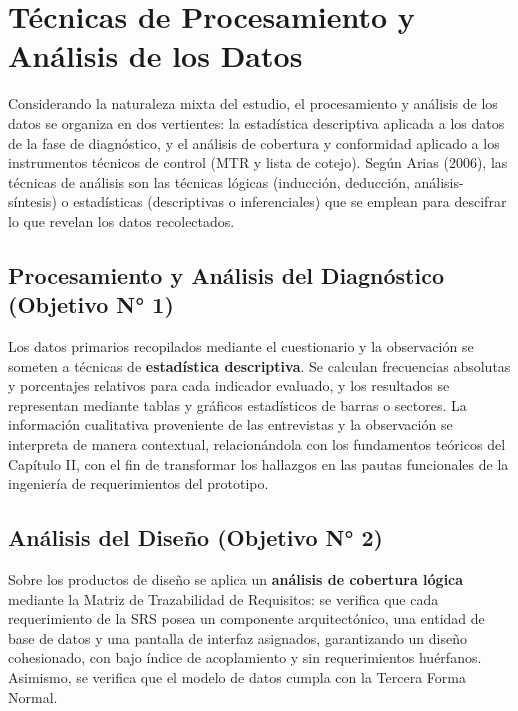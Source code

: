 \documentclass[12pt, letterpaper]{report}
\begin{document}
\section{Técnicas de Procesamiento y Análisis de los Datos}

Considerando la naturaleza mixta del estudio, el procesamiento y
análisis de los datos se organiza en dos vertientes: la estadística
descriptiva aplicada a los datos de la fase de diagnóstico, y el
análisis de cobertura y conformidad aplicado a los instrumentos
técnicos de control (MTR y lista de cotejo). Según Arias (2006), las
técnicas de análisis son las técnicas lógicas (inducción, deducción,
análisis-síntesis) o estadísticas (descriptivas o inferenciales) que se
emplean para descifrar lo que revelan los datos recolectados.

\subsection{Procesamiento y Análisis del Diagnóstico (Objetivo N° 1)}

Los datos primarios recopilados mediante el cuestionario y la
observación se someten a técnicas de \textbf{estadística descriptiva}.
Se calculan frecuencias absolutas y porcentajes relativos para cada
indicador evaluado, y los resultados se representan mediante tablas y
gráficos estadísticos de barras o sectores. La información cualitativa
proveniente de las entrevistas y la observación se interpreta de manera
contextual, relacionándola con los fundamentos teóricos del Capítulo II,
con el fin de transformar los hallazgos en las pautas funcionales de la
ingeniería de requerimientos del prototipo.

\subsection{Análisis del Diseño (Objetivo N° 2)}

Sobre los productos de diseño se aplica un \textbf{análisis de cobertura
lógica} mediante la Matriz de Trazabilidad de Requisitos: se verifica
que cada requerimiento de la SRS posea un componente arquitectónico, una
entidad de base de datos y una pantalla de interfaz asignados,
garantizando un diseño cohesionado, con bajo índice de acoplamiento y
sin requerimientos huérfanos. Asimismo, se verifica que el modelo de
datos cumpla con la Tercera Forma Normal.
\end{document}
